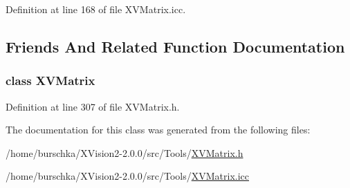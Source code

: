 Definition at line 168 of file XVMatrix.icc.

\subsection{Friends And Related Function Documentation}
\label{XVRowVector_l0}
\hypertarget{class_XVRowVector_l0}{
\subsubsection[XVMatrix]{\setlength{\rightskip}{0pt plus 5cm}class XVMatrix}}




Definition at line 307 of file XVMatrix.h.

The documentation for this class was generated from the following files:\begin{CompactItemize}
\item 
/home/burschka/XVision2-2.0.0/src/Tools/\hyperlink{XVMatrix.h-source}{XVMatrix.h}\item 
/home/burschka/XVision2-2.0.0/src/Tools/\hyperlink{XVMatrix.icc-source}{XVMatrix.icc}\end{CompactItemize}
